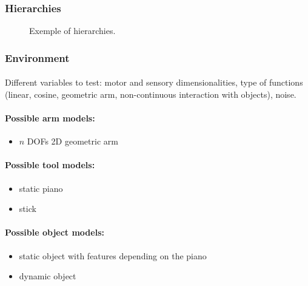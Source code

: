\documentclass[12pt]{article}
\begin{document}
		
		
		\subsubsection{Hierarchies}
		
		

			\begin{figure}[H] 
				\subfloat[]{}
				\subfloat[]{}
				\subfloat[]{}
				\subfloat[]{}
				\caption{Exemple of hierarchies.}
				\label{H}					
			\end{figure}
		
		
		\subsubsection{Environment}
		
			\paragraph{}
			Different variables to test: motor and sensory dimensionalities, type of functions (linear, cosine, geometric arm, non-continuous interaction with objects), noise.
			
			\paragraph{Possible arm models:}
			\begin{itemize}
				\item $n$ DOFs 2D geometric arm
			\end{itemize}
			
			\paragraph{Possible tool models:}
			\begin{itemize}
				\item static piano
				\item stick 
			\end{itemize}
			
			\paragraph{Possible object models:}
			\begin{itemize}
				\item static object with features depending on the piano
				\item dynamic object
			\end{itemize}
			
\end{document}
